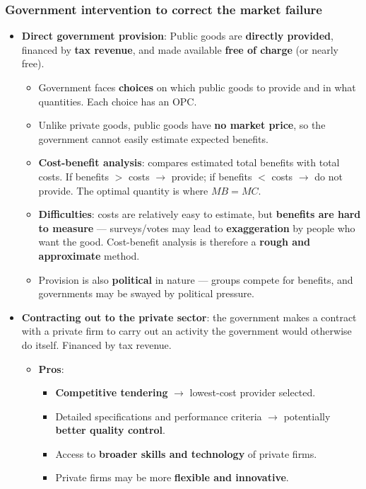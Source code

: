 \documentclass[a4paper,12pt]{article}
\begin{document}
\subsubsection*{Government intervention to correct the market failure}
\begin{itemize}
  \item \textbf{Direct government provision}: Public goods are \textbf{directly provided}, financed by \textbf{tax revenue}, and made available \textbf{free of charge} (or nearly free).
  \begin{itemize}
    \item Government faces \textbf{choices} on which public goods to provide and in what quantities. Each choice has an OPC.
    \item Unlike private goods, public goods have \textbf{no market price}, so the government cannot easily estimate expected benefits.
    \item \textbf{Cost-benefit analysis}: compares estimated total benefits with total costs. If benefits $>$ costs $\to$ provide; if benefits $<$ costs $\to$ do not provide. The optimal quantity is where $MB = MC$.
    \item \textbf{Difficulties}: costs are relatively easy to estimate, but \textbf{benefits are hard to measure} --- surveys/votes may lead to \textbf{exaggeration} by people who want the good. Cost-benefit analysis is therefore a \textbf{rough and approximate} method.
    \item Provision is also \textbf{political} in nature --- groups compete for benefits, and governments may be swayed by political pressure.
  \end{itemize}
  \item \textbf{Contracting out to the private sector}: the government makes a contract with a private firm to carry out an activity the government would otherwise do itself. Financed by tax revenue.
  \begin{itemize}
    \item \textbf{Pros}:
    \begin{itemize}
      \item \textbf{Competitive tendering} $\to$ lowest-cost provider selected.
      \item Detailed specifications and performance criteria $\to$ potentially \textbf{better quality control}.
      \item Access to \textbf{broader skills and technology} of private firms.
      \item Private firms may be more \textbf{flexible and innovative}.

\end{itemize}
\end{itemize}
\end{itemize}
\end{document}
